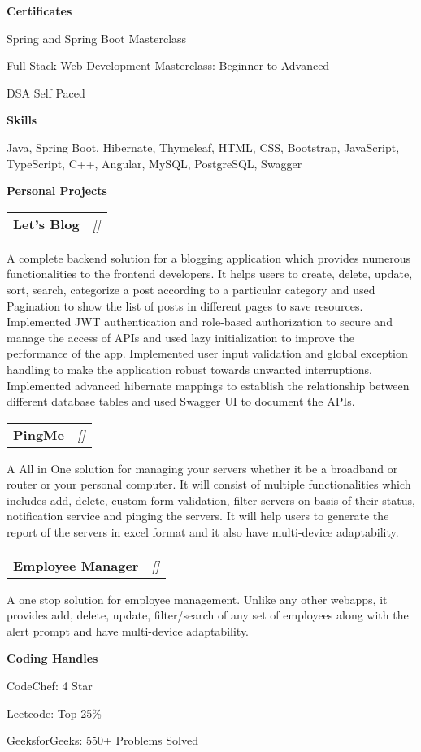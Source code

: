 \documentclass[a4paper,10pt]{article}
\makeatletter
\newcommand{\resitem}[1]{\item #1}
\newcommand{\resheading}[1]{\vspace{0.5em} {\small \colorbox{mygrey}{{\begin{minipage}{0.975\textwidth}{{\textbf{#1}}}\end{minipage}}}} \vspace{0.5em}}
\newcommand{\ressubheading}[3]{\begin{tabular*}{6.62in}{l @{\extracolsep{\fill}} r} \textbf{#1} & \textit{[#2]} \\ \end{tabular*}\vspace{-8pt}}
\makeatother
\begin{document}
\resheading{Certificates}
\resitem{Spring and Spring Boot Masterclass}
\resitem{Full Stack Web Development Masterclass: Beginner to Advanced}
\resitem{DSA Self Paced}

\resheading{Skills}
\resitem{Java, Spring Boot, Hibernate, Thymeleaf, HTML, CSS, Bootstrap, JavaScript, TypeScript, C++, Angular, MySQL, PostgreSQL, Swagger}

\resheading{Personal Projects}
\ressubheading{Let's Blog}{}{}
\resitem{A complete backend solution for a blogging application which provides numerous functionalities to the frontend developers. It helps users to create, delete, update, sort, search, categorize a post according to a particular category and used Pagination to show the list of posts in different pages to save resources. Implemented JWT authentication and role-based authorization to secure and manage the access of APIs and used lazy initialization to improve the performance of the app. Implemented user input validation and global exception handling to make the application robust towards unwanted interruptions. Implemented advanced hibernate mappings to establish the relationship between different database tables and used Swagger UI to document the APIs.}
\ressubheading{PingMe}{}{}
\resitem{A All in One solution for managing your servers whether it be a broadband or router or your personal computer. It will consist of multiple functionalities which includes add, delete, custom form validation, filter servers on basis of their status, notification service and pinging the servers. It will help users to generate the report of the servers in excel format and it also have multi-device adaptability.}
\ressubheading{Employee Manager}{}{}
\resitem{A one stop solution for employee management. Unlike any other webapps, it provides add, delete, update, filter/search of any set of employees along with the alert prompt and have multi-device adaptability.}

\resheading{Coding Handles}
\resitem{CodeChef: 4 Star}
\resitem{Leetcode: Top 25\%}
\resitem{GeeksforGeeks: 550+ Problems Solved}
\end{document}
